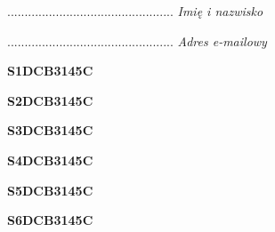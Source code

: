 \begin{turn}{90}\begin{minipage}{\linewidth} \vspace{20mm} ................................................  \textit{Imię i nazwisko}\end{minipage}\end{turn}

\begin{turn}{90}\begin{minipage}{\linewidth} \vspace{20mm} ................................................  \textit{Adres e-mailowy}\end{minipage}\end{turn}

\begin{turn}{90}\huge \begin{minipage}{\linewidth} \vspace{10mm}\textbf{S1DCB3145C}\end{minipage}\end{turn}

\begin{turn}{90}\huge \begin{minipage}{\linewidth} \vspace{10mm}\textbf{S2DCB3145C}\end{minipage}\end{turn}

\begin{turn}{90}\huge \begin{minipage}{\linewidth} \vspace{10mm}\textbf{S3DCB3145C}\end{minipage}\end{turn}

\begin{turn}{90}\huge \begin{minipage}{\linewidth} \vspace{10mm}\textbf{S4DCB3145C}\end{minipage}\end{turn}

\begin{turn}{90}\huge \begin{minipage}{\linewidth} \vspace{10mm}\textbf{S5DCB3145C}\end{minipage}\end{turn}

\begin{turn}{90}\huge \begin{minipage}{\linewidth} \vspace{10mm}\textbf{S6DCB3145C}\end{minipage}\end{turn}

